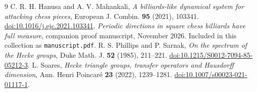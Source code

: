 \documentclass[11pt]{article}
\begin{document}
\small
\begin{thebibliography}{9}
 C. R. H. Hanusa and A. V. Mahankali, \emph{A billiards-like dynamical system for attacking chess pieces}, European J. Combin. \textbf{95} (2021), 103341. \href{https://doi.org/10.1016/j.ejc.2021.103341}{doi:10.1016/j.ejc.2021.103341}.
 \emph{Periodic directions in square chess billiards have full measure}, companion proof manuscript, November 2026. Included in this collection as \texttt{manuscript.pdf}.
 R. S. Phillips and P. Sarnak, \emph{On the spectrum of the Hecke groups}, Duke Math. J. \textbf{52} (1985), 211--221. \href{https://doi.org/10.1215/S0012-7094-85-05212-3}{doi:10.1215/S0012-7094-85-05212-3}.
 L. Soares, \emph{Hecke triangle groups, transfer operators and Hausdorff dimension}, Ann. Henri Poincar\'e \textbf{23} (2022), 1239--1281. \href{https://doi.org/10.1007/s00023-021-01117-1}{doi:10.1007/s00023-021-01117-1}.
\end{thebibliography}
\end{document}
